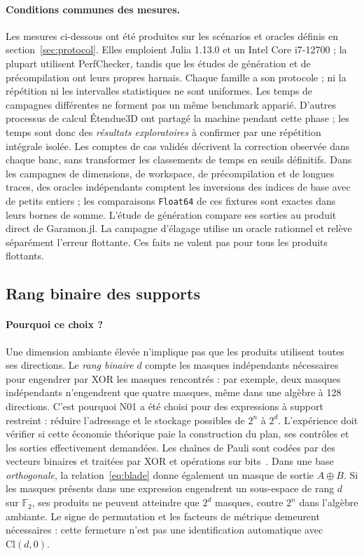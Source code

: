 \documentclass[11pt,a4paper]{article}
\newcommand{\Cl}{\mathrm{Cl}}
\newcommand{\code}[1]{\texttt{#1}}
\begin{document}
\paragraph{Conditions communes des mesures.}
Les mesures ci-dessous ont été produites sur les scénarios et oracles
définis en section~\ref{sec:protocol}. Elles emploient Julia 1.13.0 et
un Intel Core i7-12700 ; la plupart utilisent
PerfChecker, tandis que les études de génération et de précompilation ont leurs
propres harnais. Chaque
famille a son protocole ; ni la répétition ni les intervalles statistiques ne
sont uniformes. Les temps de campagnes différentes ne forment pas un même
benchmark apparié. D'autres processus de calcul Étendue3D ont partagé la
machine pendant cette phase ; les temps sont donc des \emph{résultats
exploratoires} à confirmer par une répétition intégrale isolée. Les comptes
de cas validés décrivent la correction observée dans chaque banc, sans
transformer les classements de temps en seuils définitifs.
Dans les campagnes de dimensions, de workspace, de
précompilation et de longues traces, des oracles indépendants comptent les inversions des indices
de base avec de petits entiers ; les comparaisons \code{Float64} de ces
fixtures sont exactes dans leurs bornes de somme. L'étude de génération
compare ses sorties au produit direct de Garamon.jl. La campagne d'élagage
utilise un oracle rationnel et relève séparément l'erreur flottante. Ces
faits ne valent pas pour tous les produits flottants.

\subsection{Rang binaire des supports}
\paragraph{Pourquoi ce choix ?}
Une dimension ambiante élevée n'implique pas que les produits utilisent
toutes ses directions. Le \emph{rang binaire} $d$ compte les masques
indépendants nécessaires pour engendrer par XOR les masques rencontrés :
par exemple, deux masques indépendants n'engendrent que quatre masques,
même dans une algèbre à 128 directions. C'est pourquoi N01 a été choisi
pour des expressions à support restreint : réduire l'adressage et le
stockage possibles de $2^n$ à $2^d$. L'expérience doit vérifier si cette
économie théorique paie la construction du plan, ses contrôles et les
sorties effectivement demandées.
Les chaînes de Pauli sont codées par des vecteurs binaires et traitées par
XOR et opérations sur bits~\cite{paulib}. Dans une base \emph{orthogonale},
la relation~\eqref{eq:blade} donne également un masque de sortie $A\oplus B$.
Si les masques présents dans une expression engendrent un sous-espace de rang
$d$ sur $\mathbb F_2$, ses produits ne peuvent atteindre que $2^d$ masques,
contre $2^n$ dans l'algèbre ambiante. Le signe de permutation et les facteurs
de métrique demeurent nécessaires : cette fermeture n'est pas une
identification automatique avec $\Cl(d,0)$.
\end{document}
